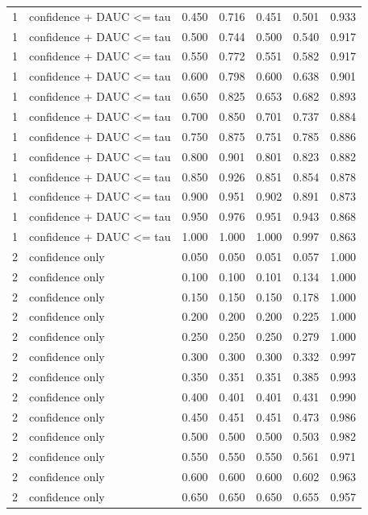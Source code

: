 \begin{tabular}{rlrrrrr}
1 & confidence + DAUC <= tau & 0.450 & 0.716 & 0.451 & 0.501 & 0.933 \\
1 & confidence + DAUC <= tau & 0.500 & 0.744 & 0.500 & 0.540 & 0.917 \\
1 & confidence + DAUC <= tau & 0.550 & 0.772 & 0.551 & 0.582 & 0.917 \\
1 & confidence + DAUC <= tau & 0.600 & 0.798 & 0.600 & 0.638 & 0.901 \\
1 & confidence + DAUC <= tau & 0.650 & 0.825 & 0.653 & 0.682 & 0.893 \\
1 & confidence + DAUC <= tau & 0.700 & 0.850 & 0.701 & 0.737 & 0.884 \\
1 & confidence + DAUC <= tau & 0.750 & 0.875 & 0.751 & 0.785 & 0.886 \\
1 & confidence + DAUC <= tau & 0.800 & 0.901 & 0.801 & 0.823 & 0.882 \\
1 & confidence + DAUC <= tau & 0.850 & 0.926 & 0.851 & 0.854 & 0.878 \\
1 & confidence + DAUC <= tau & 0.900 & 0.951 & 0.902 & 0.891 & 0.873 \\
1 & confidence + DAUC <= tau & 0.950 & 0.976 & 0.951 & 0.943 & 0.868 \\
1 & confidence + DAUC <= tau & 1.000 & 1.000 & 1.000 & 0.997 & 0.863 \\
2 & confidence only & 0.050 & 0.050 & 0.051 & 0.057 & 1.000 \\
2 & confidence only & 0.100 & 0.100 & 0.101 & 0.134 & 1.000 \\
2 & confidence only & 0.150 & 0.150 & 0.150 & 0.178 & 1.000 \\
2 & confidence only & 0.200 & 0.200 & 0.200 & 0.225 & 1.000 \\
2 & confidence only & 0.250 & 0.250 & 0.250 & 0.279 & 1.000 \\
2 & confidence only & 0.300 & 0.300 & 0.300 & 0.332 & 0.997 \\
2 & confidence only & 0.350 & 0.351 & 0.351 & 0.385 & 0.993 \\
2 & confidence only & 0.400 & 0.401 & 0.401 & 0.431 & 0.990 \\
2 & confidence only & 0.450 & 0.451 & 0.451 & 0.473 & 0.986 \\
2 & confidence only & 0.500 & 0.500 & 0.500 & 0.503 & 0.982 \\
2 & confidence only & 0.550 & 0.550 & 0.550 & 0.561 & 0.971 \\
2 & confidence only & 0.600 & 0.600 & 0.600 & 0.602 & 0.963 \\
2 & confidence only & 0.650 & 0.650 & 0.650 & 0.655 & 0.957 \\

\end{tabular}
